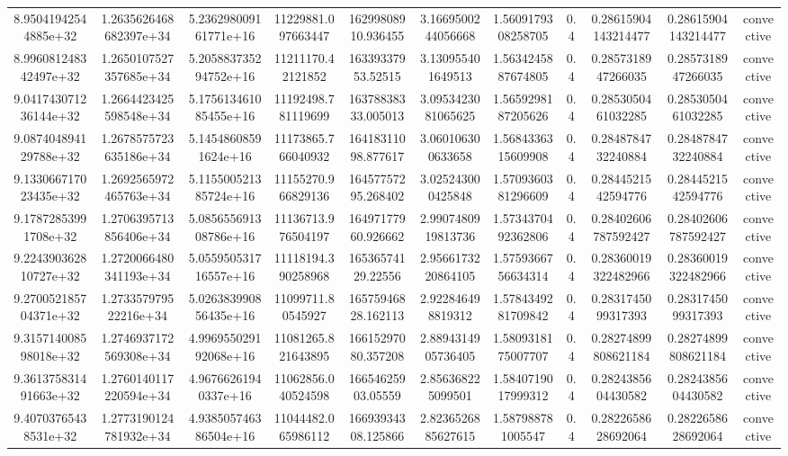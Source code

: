 \begin{table}
\begin{tabular}{ccccccccccc}
8.95041942544885e+32 & 1.2635626468682397e+34 & 5.236298009161771e+16 & 11229881.097663447 & 16299808910.936455 & 3.1669500244056668 & 1.5609179308258705 & 0.4 & 0.28615904143214477 & 0.28615904143214477 & convective \\
8.996081248342497e+32 & 1.2650107527357685e+34 & 5.205883735294752e+16 & 11211170.42121852 & 16339337953.52515 & 3.130955401649513 & 1.5634245887674805 & 0.4 & 0.2857318947266035 & 0.2857318947266035 & convective \\
9.041743071236144e+32 & 1.2664423425598548e+34 & 5.175613461085455e+16 & 11192498.781119699 & 16378838333.005013 & 3.0953423081065625 & 1.5659298187205626 & 0.4 & 0.2853050461032285 & 0.2853050461032285 & convective \\
9.087404894129788e+32 & 1.2678575723635186e+34 & 5.14548608591624e+16 & 11173865.766040932 & 16418311098.877617 & 3.060106300633658 & 1.5684336315609908 & 0.4 & 0.2848784732240884 & 0.2848784732240884 & convective \\
9.133066717023435e+32 & 1.2692565972465763e+34 & 5.115500521385724e+16 & 11155270.966829136 & 16457757295.268402 & 3.025243000425848 & 1.5709360381296609 & 0.4 & 0.2844521542594776 & 0.2844521542594776 & convective \\
9.17872853991708e+32 & 1.2706395713856406e+34 & 5.085655691308786e+16 & 11136713.976504197 & 16497177960.926662 & 2.9907480919813736 & 1.5734370492362806 & 0.4 & 0.28402606787592427 & 0.28402606787592427 & convective \\
9.224390362810727e+32 & 1.2720066480341193e+34 & 5.055950531716557e+16 & 11118194.390258968 & 16536574129.22556 & 2.9566173220864105 & 1.5759366756634314 & 0.4 & 0.28360019322482966 & 0.28360019322482966 & convective \\
9.270052185704371e+32 & 1.273357979522216e+34 & 5.026383990856435e+16 & 11099711.80545927 & 16575946828.162113 & 2.922846498819312 & 1.5784349281709842 & 0.4 & 0.2831745099317393 & 0.2831745099317393 & convective \\
9.315714008598018e+32 & 1.2746937172569308e+34 & 4.996955029192068e+16 & 11081265.821643895 & 16615297080.357208 & 2.8894314905736405 & 1.5809318175007707 & 0.4 & 0.28274899808621184 & 0.28274899808621184 & convective \\
9.361375831491663e+32 & 1.2760140117220594e+34 & 4.96766261940337e+16 & 11062856.040524598 & 16654625903.05559 & 2.856368225099501 & 1.5840719017999312 & 0.4 & 0.2824385604430582 & 0.2824385604430582 & convective \\
9.40703765438531e+32 & 1.2773190124781932e+34 & 4.938505746386504e+16 & 11044482.065986112 & 16693934308.125866 & 2.8236526885627615 & 1.587988781005547 & 0.4 & 0.2822658628692064 & 0.2822658628692064 & convective \\

\end{tabular}
\end{table}
